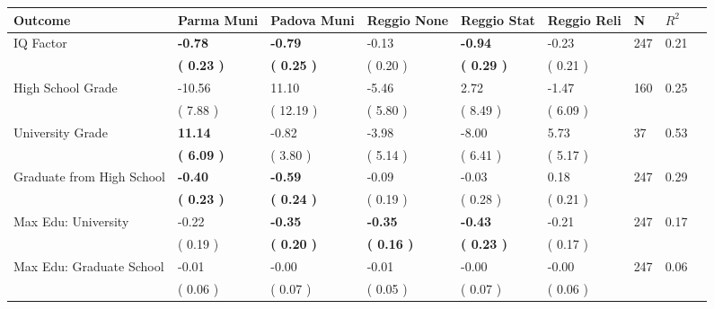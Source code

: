 \begin{tabular}{L{6.2cm} C{1.8cm} C{1.8cm} C{1.8cm} C{1.8cm} C{1.8cm} C{1.8cm} C{0.3cm} C{0.3cm}}
\toprule
 \textbf{Outcome} & \textbf{Parma Muni} & \textbf{Padova Muni} & \textbf{Reggio None} & \textbf{Reggio Stat} & \textbf{Reggio Reli} & \textbf{N} & \textbf{$ R^2$} \\
\midrule
IQ Factor & \textbf{    -0.78} & \textbf{    -0.79} &     -0.13 & \textbf{    -0.94} &     -0.23  & 247 &       0.21 \\ 
 & \textbf{(     0.23 )} & \textbf{(     0.25 )} & (     0.20 ) & \textbf{(     0.29 )} & (     0.21 )  & \\
High School Grade &    -10.56 &     11.10 &     -5.46 &      2.72 &     -1.47  & 160 &       0.25 \\ 
 & (     7.88 ) & (    12.19 ) & (     5.80 ) & (     8.49 ) & (     6.09 )  & \\
University Grade & \textbf{    11.14} &     -0.82 &     -3.98 &     -8.00 &      5.73  & 37 &       0.53 \\ 
 & \textbf{(     6.09 )} & (     3.80 ) & (     5.14 ) & (     6.41 ) & (     5.17 )  & \\
Graduate from High School & \textbf{    -0.40} & \textbf{    -0.59} &     -0.09 &     -0.03 &      0.18  & 247 &       0.29 \\ 
 & \textbf{(     0.23 )} & \textbf{(     0.24 )} & (     0.19 ) & (     0.28 ) & (     0.21 )  & \\
Max Edu: University &     -0.22 & \textbf{    -0.35} & \textbf{    -0.35} & \textbf{    -0.43} &     -0.21  & 247 &       0.17 \\ 
 & (     0.19 ) & \textbf{(     0.20 )} & \textbf{(     0.16 )} & \textbf{(     0.23 )} & (     0.17 )  & \\
Max Edu: Graduate School &     -0.01 &     -0.00 &     -0.01 &     -0.00 &     -0.00  & 247 &       0.06 \\ 
 & (     0.06 ) & (     0.07 ) & (     0.05 ) & (     0.07 ) & (     0.06 )  & \\
\bottomrule
\end{tabular}
